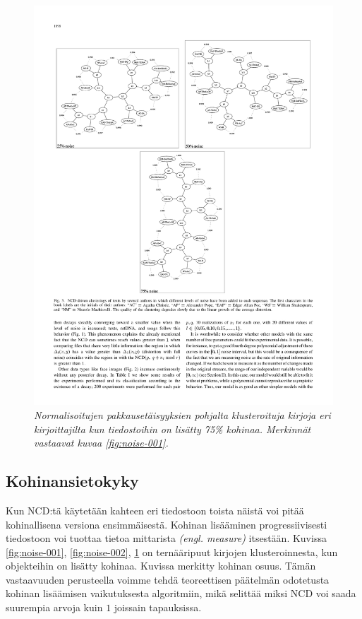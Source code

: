 \documentclass[12pt,finnish]{tktltiki2}
\theoremstyle{definition}
\theoremstyle{remark}
\newcommand{\engl}[1]{\emph{(engl. #1)}}
\begin{document}
    \begin{figure}[tb]
      \immediate{}
      \includegraphics{img/noise-003}
      \caption{\emph{Normalisoitujen pakkausetäisyyksien pohjalta klusteroituja kirjoja eri kirjoittajilta kun tiedostoihin on lisätty 75\% kohinaa. Merkinnät vastaavat kuvaa \ref{fig:noise-001}.}
      \cite{4167725}}
      \label{fig:noise-003}
    \end{figure}
  \subsection{Kohinansietokyky} %
  \label{sub:kohinansietokyky}

    Kun NCD:tä käytetään kahteen eri tiedostoon toista näistä voi pitää kohinallisena versiona ensimmäisestä.
    Kohinan lisääminen progressiivisesti tiedostoon voi tuottaa tietoa mittarista \engl{measure} itsestään.
    Kuvissa \ref{fig:noise-001}, \ref{fig:noise-002}, \ref{fig:noise-003} on ternääripuut kirjojen klusteroinnesta, kun objekteihin on lisätty kohinaa. Kuvissa merkitty kohinan osuus.
    Tämän vastaavuuden perusteella voimme tehdä teoreettisen päätelmän odotetusta kohinan lisäämisen vaikutuksesta algoritmiin, mikä selittää miksi NCD voi saada suurempia arvoja kuin $1$ joissain tapauksissa. \cite{4167725}
\end{document}
